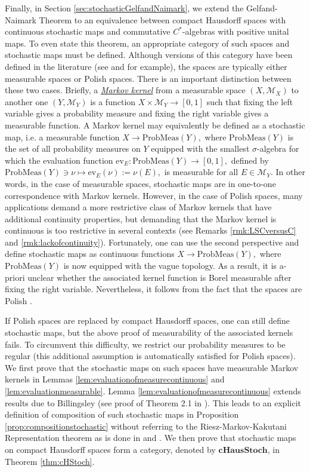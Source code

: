\documentclass[12pt]{article}
\edef\t{\pgfmathresult}%
\theoremstyle{theorem}
\theoremstyle{definition}
\numberwithin{equation}{section}
\let\s=\sigma \let\t=\tau \let\u=\upsilon \let\f=\phi \let\c=\chi
\newcommand{\<}{\langle}
\renewcommand{\>}{\rangle}
\newcommand{\cHStoch}{\mathbf{cHausStoch}}
\begin{document}
Finally, in Section \ref{sec:stochasticGelfandNaimark}, we extend the 
Gelfand-Naimark Theorem to an equivalence between 
compact Hausdorff spaces with continuous stochastic maps 
and commutative $C^*$-algebras with positive unital maps. 
To even state this theorem, an appropriate category of such
spaces and stochastic maps must be defined. Although versions 
of this category have been defined in the literature
(see \cite{Gi82} and \cite{Pa99} for example),
the spaces are typically either 
measurable spaces
or
Polish spaces.
There is an important distinction between these two cases. 
Briefly, a \uline{\emph{Markov kernel}} from a measurable space $(X,\mathcal{M}_{X})$
to another one $(Y,\mathcal{M}_{Y})$ is a function 
$X\times\mathcal{M}_{Y}\to[0,1]$ such that fixing the left variable 
gives a probability measure and fixing the right variable gives a measurable 
function.
A Markov kernel may equivalently be defined as a stochastic map, i.e. 
a measurable function $X\to\mathrm{ProbMeas}(Y),$ where 
$\mathrm{ProbMeas}(Y)$ is the set of all probability measures on $Y$
equipped with the smallest $\s$-algebra for which the evaluation function
$\mathrm{ev}_{E}:\mathrm{ProbMeas}(Y)\to[0,1],$
defined by 
$\mathrm{ProbMeas}(Y)\ni\nu\mapsto\mathrm{ev}_{E}(\nu):=\nu(E),$ 
is measurable for all $E\in\mathcal{M}_{Y}.$ 
In other words, in the case of measurable spaces, 
stochastic maps are in one-to-one correspondence with Markov kernels.
However, in the case of Polish spaces, many applications demand a 
more restrictive class of Markov kernels that have additional continuity 
properties, but demanding that the Markov kernel is continuous
is too restrictive in several contexts 
(see Remarks \ref{rmk:LSCversusC} and \ref{rmk:lackofcontinuity}).
Fortunately, 
one can use the second perspective and define stochastic maps
as continuous functions $X\to\mathrm{ProbMeas}(Y),$ 
where $\mathrm{ProbMeas}(Y)$ is now equipped with the vague topology.
As a result, it is a-priori unclear whether the associated kernel function
is Borel measurable after fixing the right variable. 
Nevertheless, it follows from the fact that the spaces are Polish \cite{Gi82}. 

If Polish spaces are replaced by compact Hausdorff spaces, 
one can still define stochastic maps, but the above proof of measurability 
of the associated kernels fails. To circumvent this difficulty, 
we restrict our probability measures to be regular (this additional
assumption is automatically satisfied for Polish spaces). 
We first prove that the stochastic maps 
on such spaces have measurable Markov kernels in Lemmas
\ref{lem:evaluationofmeasurecontinuous} and \ref{lem:evaluationmeasurable}. 
Lemma \ref{lem:evaluationofmeasurecontinuous} extends 
results due to Billingsley (see proof of Theorem 2.1 in \cite{Bi56}). 
This leads to an explicit definition of composition of such stochastic maps 
in Proposition \ref{prop:compositionstochastic} without referring
to the Riesz-Markov-Kakutani Representation theorem 
as is done in \cite{FuJa13} and \cite{EFHN15}. 
We then prove that stochastic maps %
on compact Hausdorff spaces
form a category, denoted by $\cHStoch$, in Theorem \ref{thm:cHStoch}. 
\end{document}
